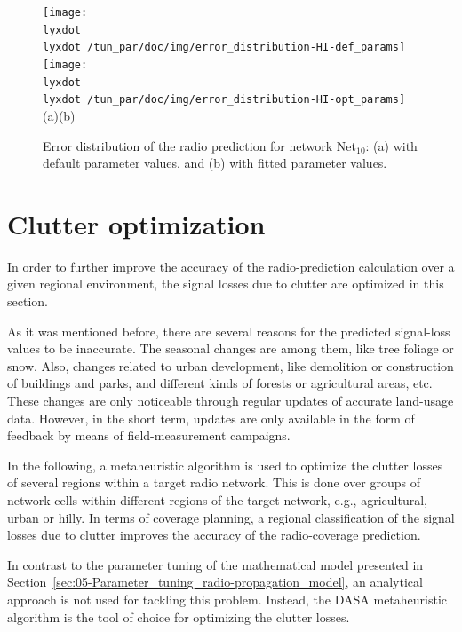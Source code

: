 \begin{figure}[h]
\centering

\texttt{[image: \\lyxdot \\lyxdot /tun\_par/doc/img/error\_distribution-HI-def\_params]}\texttt{[image: \\lyxdot \\lyxdot /tun\_par/doc/img/error\_distribution-HI-opt\_params]}\\\hspace*{0.2in}(a)\hspace*{3.2in}(b)

\caption{Error distribution of the radio prediction for network Net$_{10}$:
(a) with default parameter values, and (b) with fitted parameter values.\label{fig:05-Error_distribution_for_Net10}}
\end{figure}



\section{Clutter optimization \label{sec:05-Clutter_optimization}}

In order to further improve the accuracy of the radio-prediction calculation
over a given regional environment, the signal losses due to clutter
are optimized in this section.

As it was mentioned before, there are several reasons for the predicted
signal-loss values to be inaccurate. The seasonal changes are among
them, like tree foliage or snow. Also, changes related to urban development,
like demolition or construction of buildings and parks, and different
kinds of forests or agricultural areas, etc. These changes are only
noticeable through regular updates of accurate land-usage data. However,
in the short term, updates are only available in the form of feedback
by means of field-measurement campaigns.

In the following, a metaheuristic algorithm is used to optimize the
clutter losses of several regions within a target radio network. This
is done over groups of network cells within different regions of the
target network, e.g., agricultural, urban or hilly. In terms of coverage
planning, a regional classification of the signal losses due to clutter
improves the accuracy of the radio-coverage prediction.

In contrast to the parameter tuning of the mathematical model presented
in Section~\ref{sec:05-Parameter_tuning_radio-propagation_model},
an analytical approach is not used for tackling this problem. Instead,
the DASA metaheuristic algorithm is the tool of choice for optimizing
the clutter losses.

